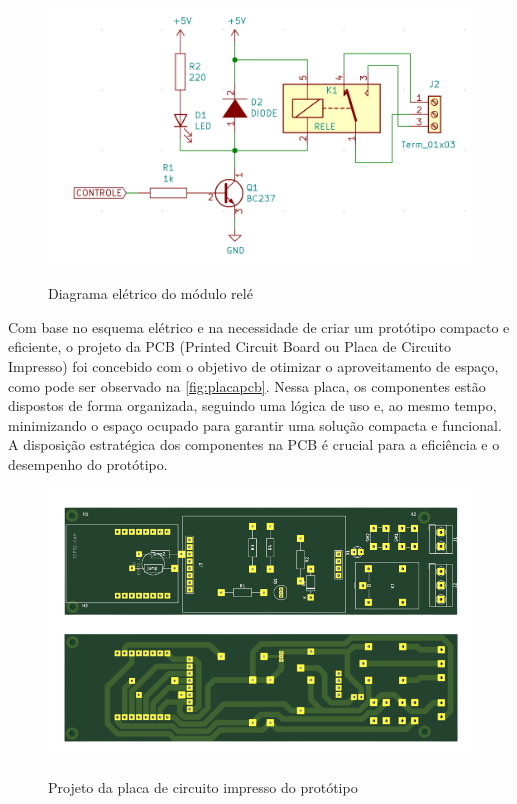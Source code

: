 \begin{figure}[h!]
    \centering
    \caption{Diagrama elétrico do módulo relé}
    \includegraphics[scale=0.2]{figuras/modulo_rele_esquema.png}
    \fonte{}%
    \label{fig:diagramarele}
    \centering
\end{figure}

Com base no esquema elétrico e na necessidade de criar um protótipo 
compacto e eficiente, o projeto da PCB (Printed Circuit Board ou 
Placa de Circuito Impresso) foi concebido com o objetivo de otimizar 
o aproveitamento de espaço, como pode ser observado na \autoref{fig:placapcb}. 
Nessa placa, os componentes estão dispostos de forma organizada, 
seguindo uma lógica de uso e, ao mesmo tempo, minimizando o espaço 
ocupado para garantir uma solução compacta e funcional. A disposição 
estratégica dos componentes na PCB é crucial para a eficiência e o 
desempenho do protótipo.

\begin{figure}[h!]
    \centering
    \caption{Projeto da placa de circuito impresso do protótipo}
    \includegraphics[scale=0.25]{figuras/placa_pcb.png}
    \fonte{}%
    \label{fig:placapcb}
    \centering
\end{figure}

